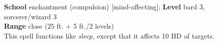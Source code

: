 \textbf{School} enchantment (compulsion) [mind-affecting]; \textbf{Level} bard 3, sorcerer/wizard 3\\
\textbf{Range} close (25 ft. + 5 ft./2 levels)\\
This spell functions like \textit{sleep, }except that it affects 10 HD of targets.\\
